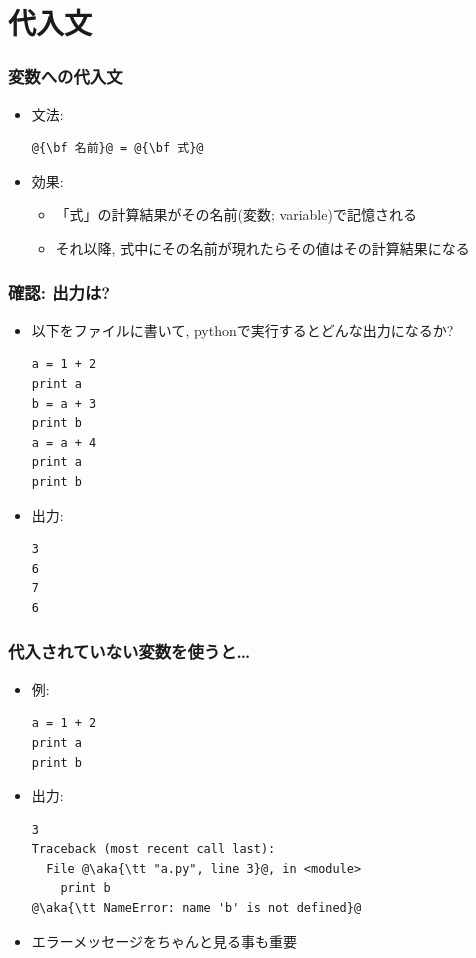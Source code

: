 \documentclass[10pt,dvipdfmx]{beamer}
\newcommand{\aka}[1]{{\color{red}#1}}
\begin{document}
\section{代入文}

\begin{frame}[fragile]
\frametitle{変数への代入文}
\begin{itemize}
\item 文法:
\begin{lstlisting}
@{\bf 名前}@ = @{\bf 式}@
\end{lstlisting}
\item 効果: 
  \begin{itemize}
  \item 「式」の計算結果がその名前(変数; variable)で記憶される
  \item それ以降, 式中にその名前が現れたらその値はその計算結果になる
  \end{itemize}
\end{itemize}
\end{frame}

\begin{frame}[fragile]
\frametitle{確認: 出力は?}
\begin{itemize}
\item 以下をファイルに書いて, pythonで実行するとどんな出力になるか?
\begin{lstlisting}
a = 1 + 2
print a
b = a + 3
print b
a = a + 4
print a
print b
\end{lstlisting}
\item<2> 出力:
\begin{lstlisting}
3
6
7
6
\end{lstlisting}
\end{itemize}
\end{frame}

\begin{frame}[fragile]
\frametitle{代入されていない変数を使うと\ldots}
\begin{itemize}
\item 例:
\begin{lstlisting}
a = 1 + 2
print a
print b
\end{lstlisting}
\item<2> 出力:
\begin{lstlisting}
3
Traceback (most recent call last):
  File @\aka{\tt "a.py", line 3}@, in <module>
    print b
@\aka{\tt NameError: name 'b' is not defined}@
\end{lstlisting}
\item<2> エラーメッセージをちゃんと見る事も重要
\end{itemize}
\end{frame}
\end{document}
